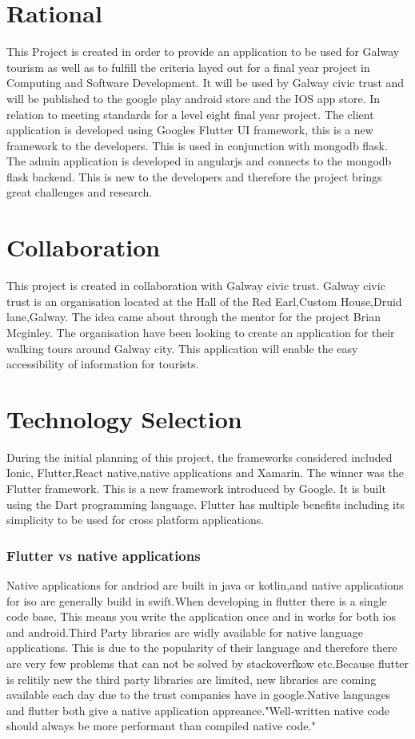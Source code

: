 \section{Rational}
This Project is created in order to provide an application to be used for Galway tourism as well as to fulfill the criteria layed out for a final year project in Computing and Software Development. It will be used by Galway civic trust and will be published to the google play android store and the IOS app store. In relation to meeting standards for a level eight final year project. The client application is developed using Googles Flutter UI framework, this is a new framework to the developers. This is used in conjunction with mongodb flask. The admin application is developed in angularjs and connects to the mongodb flask backend. This is new to the developers and therefore the project brings great challenges and research.

\section{Collaboration}
This project is created in collaboration with Galway civic trust. Galway civic trust is an organisation located at the Hall of the Red Earl,Custom House,Druid lane,Galway. The idea came about through the mentor for the project Brian Mcginley. The organisation have been looking to create an application for their walking tours around Galway city. This application will enable the easy accessibility of information for tourists. 

\section{Technology Selection}
During the initial planning of this project, the frameworks considered included Ionic, Flutter,React native,native applications and Xamarin. The winner was the Flutter framework. This is a new framework introduced by Google. It is built using the Dart programming language. Flutter has multiple benefits including its simplicity to be used for cross platform applications.


\subsubsection{Flutter vs native applications}
Native applications for andriod are built in java or kotlin,and native applications for iso are generally build in swift.When developing in flutter there is a single code base, This means you write the application once and in works for both ios and android.Third Party libraries are widly available for native language applications. This is due to the popularity of their language and therefore there are very few problems that can not be solved by stackoverfkow etc.Because flutter is relitily new the third party libraries are limited, new libraries are coming available each day due to the trust companies have in google.Native languages and flutter both give a native application appreance."Well-written native code should always be more performant than compiled native code." \cite{FlutterVS_2018}


